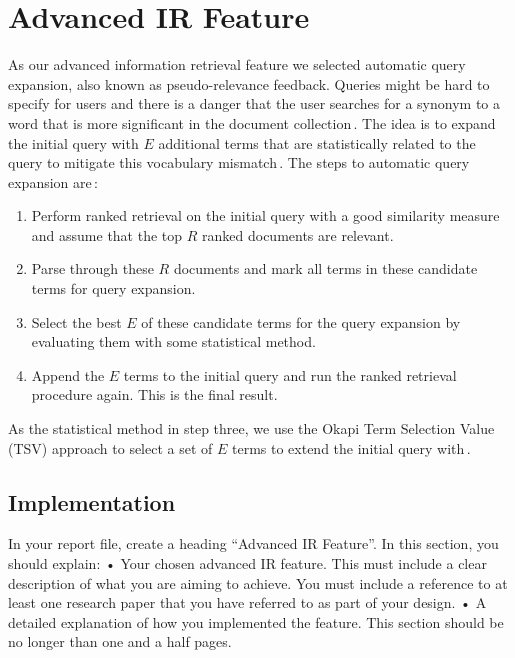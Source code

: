 
\section{Advanced IR Feature}
As our advanced information retrieval feature we selected automatic query expansion, also known as pseudo-relevance feedback. Queries might be hard to specify for users and there is a danger that the user searches for a synonym to a word that is more significant in the document collection\,\cite{billerbeckzobel04}. The idea is to expand the initial query with $E$ additional terms that are statistically related to the query to mitigate this vocabulary mismatch\,\cite{billerbeckzobel04}. The steps to automatic query expansion are\,\cite{scholer13}: 

\begin{enumerate}
	\item Perform ranked retrieval on the initial query with a good similarity measure and assume that the top $R$ ranked documents are relevant.
	\item Parse through these $R$ documents and mark all terms in these candidate terms for query expansion.
	\item Select the best $E$ of these candidate terms for the query expansion by evaluating them with some statistical method.
	\item Append the $E$ terms to the initial query and run the ranked retrieval procedure again. This is the final result.
\end{enumerate}

As the statistical method in step three, we use the Okapi Term Selection Value (TSV) approach to select a set of $E$ terms to extend the initial query with\,\cite{billerbeckzobel04}.

\subsection{Implementation}



In your report file, create a heading “Advanced IR Feature”. In this section, you should explain:
• Your chosen advanced IR feature. This must include a clear description of what you are aiming to achieve. You must include a reference to at least one research paper that you have referred to as part of your design.
• A detailed explanation of how you implemented the feature. This section should be no longer than one and a half pages.